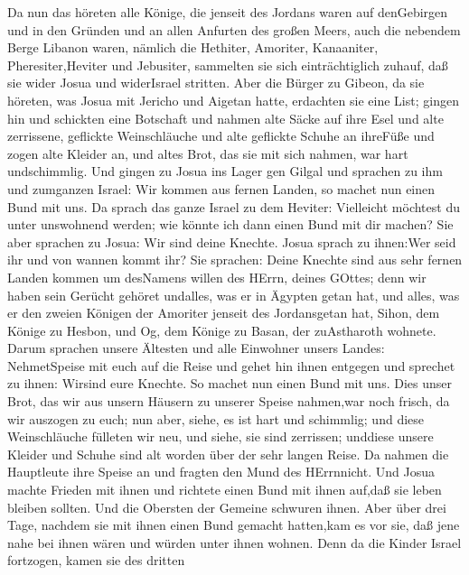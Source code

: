  Da nun das höreten alle Könige, die jenseit des Jordans
waren auf denGebirgen und in den Gründen und an allen Anfurten des
großen Meers, auch die nebendem Berge Libanon waren, nämlich die
Hethiter, Amoriter, Kanaaniter, Pheresiter,Heviter und Jebusiter,
 sammelten sie sich einträchtiglich zuhauf, daß sie wider
Josua und widerIsrael stritten.  Aber die Bürger zu Gibeon,
da sie höreten, was Josua mit Jericho und Aigetan hatte, erdachten sie
eine List;  gingen hin und schickten eine Botschaft und
nahmen alte Säcke auf ihre Esel  und alte zerrissene,
geflickte Weinschläuche und alte geflickte Schuhe an ihreFüße und zogen
alte Kleider an, und altes Brot, das sie mit sich nahmen, war hart
undschimmlig.  Und gingen zu Josua ins Lager gen Gilgal und
sprachen zu ihm und zumganzen Israel: Wir kommen aus fernen Landen, so
machet nun einen Bund mit uns.  Da sprach das ganze Israel
zu dem Heviter: Vielleicht möchtest du unter unswohnend werden; wie
könnte ich dann einen Bund mit dir machen?  Sie aber
sprachen zu Josua: Wir sind deine Knechte. Josua sprach zu ihnen:Wer
seid ihr und von wannen kommt ihr?  Sie sprachen: Deine
Knechte sind aus sehr fernen Landen kommen um desNamens willen des
HErrn, deines GOttes; denn wir haben sein Gerücht gehöret undalles, was
er in Ägypten getan hat,  und alles, was er den zweien
Königen der Amoriter jenseit des Jordansgetan hat, Sihon, dem Könige zu
Hesbon, und Og, dem Könige zu Basan, der zuAstharoth wohnete.
 Darum sprachen unsere Ältesten und alle Einwohner unsers
Landes: NehmetSpeise mit euch auf die Reise und gehet hin ihnen entgegen
und sprechet zu ihnen: Wirsind eure Knechte. So machet nun einen Bund
mit uns.  Dies unser Brot, das wir aus unsern Häusern zu
unserer Speise nahmen,war noch frisch, da wir auszogen zu euch; nun
aber, siehe, es ist hart und schimmlig;  und diese
Weinschläuche fülleten wir neu, und siehe, sie sind zerrissen; unddiese
unsere Kleider und Schuhe sind alt worden über der sehr langen Reise.
 Da nahmen die Hauptleute ihre Speise an und fragten den
Mund des HErrnnicht.  Und Josua machte Frieden mit ihnen
und richtete einen Bund mit ihnen auf,daß sie leben bleiben sollten. Und
die Obersten der Gemeine schwuren ihnen.  Aber über drei
Tage, nachdem sie mit ihnen einen Bund gemacht hatten,kam es vor sie,
daß jene nahe bei ihnen wären und würden unter ihnen wohnen.
 Denn da die Kinder Israel fortzogen, kamen sie des dritten
